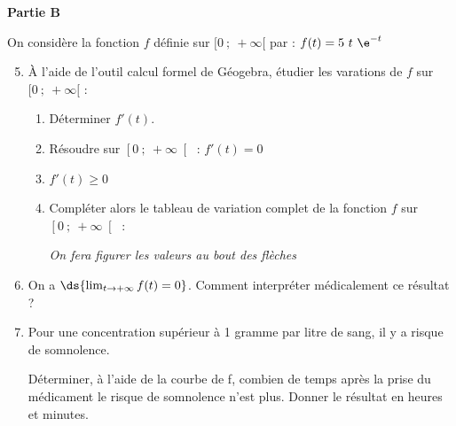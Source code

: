 {\bf Partie B}\par \medskip

On considère la fonction $f$ définie sur $[0~;~+\infty[$ par : $f(t)=5~t~\e^{-t}$

\begin{enumerate}
	\setcounter{enumi}{4}
	\item À l'aide de l'outil calcul formel de Géogebra, étudier les varations de $f$ sur $[0~;~+\infty[$ :
	
	\begin{enumerate}
		\item Déterminer $f'(t)$.~ \dotfill \medskip
		
		\item Résoudre sur $\left[0~;~+\infty\right[$ : $f'(t)=0$ \hspace*{0.5cm} \dotfill \par \medskip
		
		\item \hspace*{4.2cm}$f'(t)\geq 0$ \hspace*{0.5cm} \dotfill \par \medskip
		
		\item Compléter alors le tableau de variation complet de la fonction $f$ sur $\left[0~;~+\infty\right[$ :
		
		{\it \small On fera figurer les valeurs au bout des flèches}
		
		\begin{center}
		\end{center}
		\end{enumerate}	
	
	\item On a $\ds{\lim_{t\rightarrow+\infty}f(t)=0}$. Comment interpréter médicalement ce résultat ?\par \vspace*{0.5cm}

	\item Pour une concentration supérieur à 1 gramme par litre de sang, il y a risque de somnolence.
	
	Déterminer, à l’aide de la courbe de f, combien de temps après la prise du médicament le risque de somnolence n’est plus. Donner le résultat en heures et minutes.\par \vspace*{0.5cm}

\end{enumerate}

